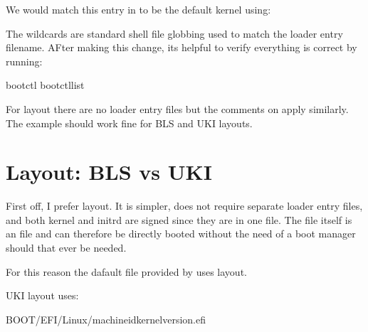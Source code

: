 \documentclass[letterpaper,11pt,english]{sphinxmanual}
\begin{document}
\sphinxAtStartPar
We would match this entry in  to be the default kernel using:

\begin{sphinxVerbatim}[commandchars=\\\{\}]
 
 
  
\end{sphinxVerbatim}

\sphinxAtStartPar
The wildcards are standard shell file globbing used to match the loader entry filename.
AFter making this change, its helpful to verify everything is correct by running:

\begin{sphinxVerbatim}[commandchars=\\\{\}]
bootctl
bootctllist
\end{sphinxVerbatim}

\sphinxAtStartPar
For  layout there are no loader entry files but the comments on  apply
similarly. The  example should work fine for BLS and UKI layouts.

\sphinxstepscope


\chapter{Layout: BLS vs UKI}
\label{\detokenize{Layout:layout-bls-vs-uki}}\label{\detokenize{Layout::doc}}
\sphinxAtStartPar
First off, I prefer  layout. It is simpler, does not require separate loader entry
files, and both kernel and initrd are signed since they are in one file. The  file
itself is an  file and can therefore be directly booted without the need of a boot manager
should that ever be needed.

\sphinxAtStartPar
For this reason the dafault  file provided by  uses  layout.

\sphinxAtStartPar
UKI layout uses:

\begin{sphinxVerbatim}[commandchars=\\\{\}]
\PYGZdl{}BOOT/EFI/Linux/\PYGZlt{}machine\PYGZhy{}id\PYGZgt{}\PYGZhy{}\PYGZlt{}kernel\PYGZhy{}version\PYGZgt{}.efi
\end{sphinxVerbatim}
\end{document}
